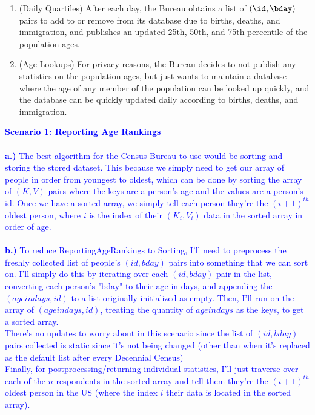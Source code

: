 \documentclass[11pt]{article}
\begin{document}
\begin{enumerate}
\begin{enumerate}
\item (Daily Quartiles)
After each day, the Bureau obtains a list of $(\id,\bday)$ pairs to add to or remove from its database due to births, deaths, and immigration, and publishes an updated 25th, 50th, and 75th percentile of the population ages.

\item (Age Lookups)
For privacy reasons, the Bureau decides to not publish any statistics on the population ages, but just wants to maintain a database where the age of any member of the population can be looked up quickly, and the database can be quickly updated daily according to births, deaths, and immigration. \\
 \end{enumerate}

\textcolor{blue}{
\textbf{Scenario 1: Reporting Age Rankings} \\ \\
\textbf{a.)} The best algorithm for the Census Bureau to use would be sorting and storing the stored dataset. This because we simply need to get our array of people in order from youngest to oldest, which can be done by sorting the array of $(K,V)$ pairs where the keys are a person's age and the values are a person's id. Once we have a sorted array, we simply tell each person they're the $(i+1)^{th}$ oldest person, where $i$ is the index of their $(K_i, V_i)$ data in the sorted array in order of age. \\ \\
\textbf{b.)} To reduce ReportingAgeRankings to Sorting, I'll need to preprocess the freshly collected list of people's $(id, bday)$ pairs into something that we can sort on. I'll simply do this by iterating over each $(id, bday)$ pair in the list, converting each person's "bday" to their age in days, and appending the $(ageindays, id)$ to a list originally initialized as empty. Then, I'll run \MergeSort{} on the array of $(ageindays, id)$, treating the quantity of $ageindays$ as the keys, to get a sorted array.\\
There's no updates to worry about in this scenario since the list of $(id, bday)$ pairs collected is static since it's not being changed (other than when it's replaced as the default list after every Decennial Census) \\
Finally, for postprocessing/returning individual statistics, I'll just traverse over each of the $n$ respondents in the sorted array and tell them they're the $(i+1)^{th}$ oldest person in the US (where the index $i$ their data is located in the sorted array). \\ \\
}
\end{enumerate}
\end{document}
